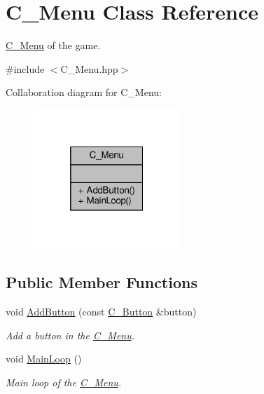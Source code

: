 \hypertarget{classC__Menu}{}\section{C\+\_\+\+Menu Class Reference}
\label{classC__Menu}


\hyperlink{classC__Menu}{C\+\_\+\+Menu} of the game.  




{\ttfamily \#include $<$C\+\_\+\+Menu.\+hpp$>$}



Collaboration diagram for C\+\_\+\+Menu\+:\nopagebreak
\begin{figure}[H]
\begin{center}
\leavevmode
\includegraphics[width=157pt]{classC__Menu__coll__graph}
\end{center}
\end{figure}
\subsection*{Public Member Functions}
\begin{DoxyCompactItemize}
\item 
void \hyperlink{classC__Menu_a9a4f7a0022f39f35b7af9c5d2b6f31ec}{Add\+Button} (const \hyperlink{classC__Button}{C\+\_\+\+Button} \&button)
\begin{DoxyCompactList}\small\item\em Add a button in the \hyperlink{classC__Menu}{C\+\_\+\+Menu}. \end{DoxyCompactList}\item 
void \hyperlink{classC__Menu_a9529be708fad2c6deca21034bc37f59d}{Main\+Loop} ()
\begin{DoxyCompactList}\small\item\em Main loop of the \hyperlink{classC__Menu}{C\+\_\+\+Menu}. \end{DoxyCompactList}\end{DoxyCompactItemize}


